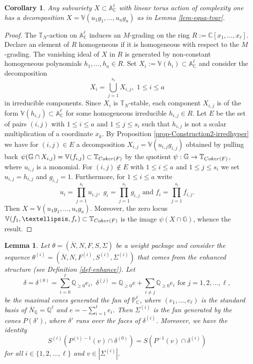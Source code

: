 \documentclass[11pt, reqno]{amsart}
\theoremstyle{plain}
\newtheorem{lemma}[theorem]{Lemma}
\newtheorem{corollary}[theorem]{Corollary}
\theoremstyle{definition}
\theoremstyle{remark}
\begin{document}
\begin{corollary}\label{xoro-expliteqvarT}
Any subvariety $X\subset \mathbb{A}^{\ell}_{\mathbb{C}}$ with linear torus action of complexity one has a
decomposition $X  =  \mathbb{V}(u_{1}g_{1}, \ldots, u_{a}g_{a})$ as in Lemma \ref{lem-equa-tvar}.
\end{corollary}
\begin{proof}
The $\mathbb{T}_{N}$-action on $\mathbb{A}^{\ell}_{\mathbb{C}}$ induces an $M$-grading on the ring $R:= \mathbb{C}[x_{1}, \ldots, x_{\ell}]$. Declare an element of $R$ homogeneous if it is homogeneous with respect to the $M$-grading.
The vanishing ideal of $X$ in $R$ is generated by non-constant homogeneous polynomials $h_{1}, \ldots, h_{a}\in R$. Set $X_{i}:= \mathbb{V}(h_{i})\subset \mathbb{A}^{\ell}_{\mathbb{C}}$ and consider the decomposition
$$ X_{i} =  \bigcup_{j =  1}^{s_{i}}X_{i, j}, \,\, 1\leq i\leq a$$
in irreducible components. Since $X_{i}$ is $\mathbb{T}_{N}$-stable, each component $X_{i, j}$ is of the form $\mathbb{V}(h_{i, j})\subset \mathbb{A}^{\ell}_{\mathbb{C}}$ for some homogeneous irreducible $h_{i, j}\in R$. Let $E$ be the set of pairs $(i, j)$ with $1\leq i\leq a$ and $1\leq j\leq s_{i}$
such that $h_{i, j}$ is not a scalar multiplication of a coordinate $x_{k}$. By 
Proposition \ref{prop-Construction2-irredhyper} we have  for $(i, j)\in E$ a decomposition $X_{i, j}  =  \mathbb{V}(u_{i, j} g_{i, j})$
obtained by pulling back $\psi(\mathbb{G}\cap X_{i, j}) = \mathbb{V}(f_{i, j})\subset \mathbb{T}_{{\rm Coker}(F)}$ by the quotient $\psi: \mathbb{G}\rightarrow \mathbb{T}_{{\rm Coker}(F)}$, where $u_{i, j}$ is a monomial. 
For $(i, j)\not\in E$ with $1\leq i\leq a$ and $1\leq j\leq s_{i}$ we set $u_{i, j} =  h_{i, j}$ and $g_{i, j} =  1$. Furthermore, for $1\leq i\leq a$
write 
$$ u_{i} =  \prod_{j = 1}^{s_{i}} u_{i, j},\,\, g_{i} =  \prod_{j =  1}^{s_{i}}g_{i, j} \text{ and }f_{i}  =  \prod_{j =  1}^{s_{i}}f_{i, j}.$$
Then $X  =  \mathbb{V}(u_{1}g_{1}, \ldots, u_{r}g_{a})$. Moreover, the zero locus $\mathbb{V}(f_{1}, \ldots, f_{r})\subset \mathbb{T}_{{\rm Coker}(F)}$ is the image $\psi(X\cap \mathbb{G})$, whence the result. 
\end{proof}
\begin{lemma}\label{lem-P-matrix}
Let $\theta =  (\overline{N}, N, F, S, \Sigma)$ be a weight package and consider the sequence 
$\theta^{(i)} =  (\overline{N}, N, F^{(i)}, S^{(i)}, \Sigma^{(i)})$ that comes from the enhanced structure (see Definition \ref{def-enhance}).
Let 
$$\delta =  \delta^{(0)} =  \sum_{i =  0}^{\ell}\mathbb{Q}_{\geq 0}e_{i},\,\, \delta^{(j)} =  \mathbb{Q}_{\geq 0}e +\sum_{i\neq j}\mathbb{Q}_{\geq 0}e_{i} \text{ for }j = 1,2, \ldots, \ell,$$
be the maximal cones generated the fan of $\mathbb{P}_{\mathbb{C}}^{\ell}$, where $(e_{1}, \ldots, e_{\ell})$ is the standard
basis of $\overline{N}_{\mathbb{Q}} =  \mathbb{Q}^{\ell}$ and $e  = -\sum_{i =1}^{\ell}e_{i}$. Then $\Sigma^{(i)}$
is the fan generated by the cones $P(\delta')$, where $\delta'$ runs over the faces of $\delta^{(i)}$.
Moreover, we have the identity 
$$S^{(i)}(P^{(i)-1}(v)\cap \delta^{(0)})  =  S(P^{-1}(v)\cap \delta^{(i)})$$
for all $i\in\{1, 2, \ldots, \ell\}$ and $v\in |\Sigma^{(i)}|$. 
\end{lemma}
\end{document}
